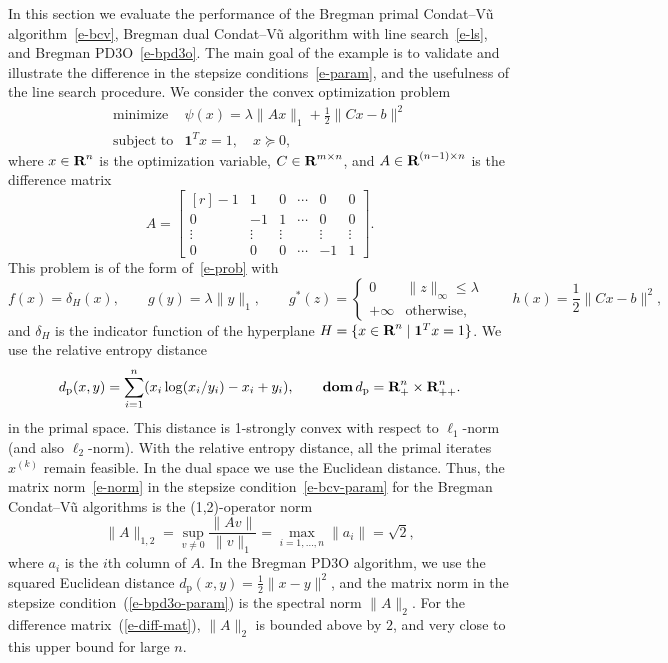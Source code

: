 \documentclass[letterpaper,11pt]{article}
\newcommand{\BEQ}{\begin{equation}}
\newcommand{\EEQ}{\end{equation}}
\newcommand{\dom}{\mathop{\bf dom}}
\newcommand{\ones}{\mathbf 1}
\newcommand{\reals}{{\mbox{\bf R}}}
\newcommand{\primal}{\mathrm p}
\begin{document}
In this section we evaluate the performance of the Bregman primal
Condat--V\~u algorithm~\eqref{e-bcv}, 
Bregman dual Condat--V\~u algorithm with line search~\eqref{e-ls},
and Bregman PD3O~\eqref{e-bpd3o}.
The main goal of the example is to validate and illustrate
the difference in the stepsize conditions~\eqref{e-param}, and
the usefulness of the line search procedure.
We consider the convex optimization problem
\begin{equation} \label{e-exp-prob}
\begin{array}{ll}
  \mbox{minimize} & \psi(x) = \lambda \|Ax\|_1+\tfrac{1}{2}\|Cx-b\|^2 \\
  \mbox{subject to} & \ones^Tx=1, \quad x \succeq 0,
\end{array}
\end{equation} 
where $x \in \reals^n$ is the optimization variable,
$C \in \reals^{m \times n}$,
and $A \in \reals^{(n-1) \times n}$ is the difference matrix
\BEQ \label{e-diff-mat}
A = \begin{bmatrix}[r]
  -1 & 1 & 0 & \cdots & 0 & 0 \\
  0 & -1 & 1 & \cdots & 0 & 0 \\
  \vdots & \vdots & \vdots & & \vdots & \vdots \\
  0 & 0 & 0 & \cdots & -1 & 1
\end{bmatrix}.
\EEQ 
This problem is of the form of~\eqref{e-prob} with
\[
f(x)=\delta_H(x), \qquad g(y)=\lambda \|y\|_1, \qquad
g^\ast(z) = \begin{cases}
  0 \quad &\|z\|_\infty \leq \lambda \\
  +\infty &\mbox{otherwise,}
\end{cases} \qquad h(x)=\frac{1}{2}\|Cx-b\|^2,
\] 
and $\delta_H$ is the indicator function of the hyperplane
$H=\{x \in \reals^n \mid \ones^Tx=1\}$.
We use the relative entropy distance 
\[
d_\primal(x,y) = \sum_{i=1}^n(x_i \log(x_i/y_i) - x_i + y_i),
\qquad \dom d_\primal = \reals^n_+ \times \reals^n_{++}.
\]
in the primal space.
This distance is 1-strongly convex with respect to
$\ell_1$-norm~\cite{BeT:09b} (and also $\ell_2$-norm).
With the relative entropy distance, all the primal iterates $x^{(k)}$
remain feasible.
In the dual space we use the Euclidean distance.
Thus, the matrix norm~\eqref{e-norm} in the stepsize 
condition~\eqref{e-bcv-param} for the Bregman Condat--V\~u
algorithms is the (1,2)-operator norm
\[
\|A\|_{1,2}=\sup_{v \neq 0} \frac{\|Av\|}{\|v\|_1}
=\max_{i=1,\ldots,n} \|a_i\|=\sqrt 2,
\] 
where $a_i$ is the $i$th column of $A$.
In the Bregman PD3O algorithm, we use the squared Euclidean
distance $d_\primal(x,y) = \tfrac{1}{2} \|x-y\|^2$,
and the matrix norm in the stepsize condition~(\ref{e-bpd3o-param})
is the spectral norm $\|A\|_2$.
For the difference matrix~(\ref{e-diff-mat}),
$\|A\|_2$ is bounded above by $2$, and very close to this upper bound
for large $n$.  
\end{document}
